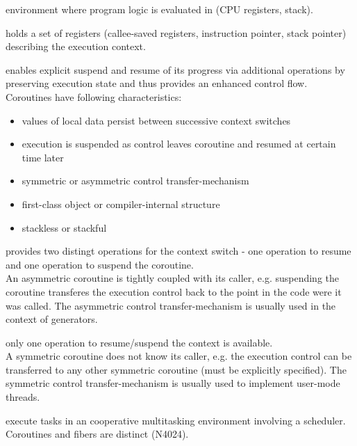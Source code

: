 
environment where program logic is evaluated in (CPU registers, stack).

holds a set of registers (callee-saved registers, instruction pointer, stack
pointer) describing the execution context.

enables explicit suspend and resume of its progress via additional operations by
preserving execution state and thus provides an enhanced control flow.
Coroutines have following characteristics\cite{N3985}:
\begin{itemize}
    \item values of local data persist between successive context switches
    \item execution is suspended as control leaves coroutine and resumed at
          certain time later
    \item symmetric or asymmetric control transfer-mechanism
    \item first-class object or compiler-internal structure
    \item stackless or stackful
\end{itemize}

provides two distingt operations for the context switch - one operation to
resume and one operation to suspend the coroutine.\\
An asymmetric coroutine is tightly coupled with its caller, e.g. suspending the
coroutine transferes the execution control back to the point in the code were it
was called. The asymmetric control transfer-mechanism is usually used in the
context of generators.

only one operation to resume/suspend the context is available.\\
A symmetric coroutine does not know its caller, e.g. the execution control can
be transferred to any other symmetric coroutine (must be explicitly specified).
The symmetric control transfer-mechanism is usually used to implement user-mode
threads.

execute tasks in an cooperative multitasking environment involving a
scheduler. Coroutines and fibers are distinct (N4024\cite{N4024}).

